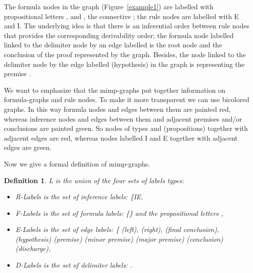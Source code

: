 \documentclass[submission,copyright,creativecommons]{eptcs}
\newtheorem{definition}{Definition}
\begin{document}
The formula nodes in the graph (Figure~\ref{example1}) are labelled with
propositional letters ,  and , the connective ; the
rule nodes are labelled with E and I. The
underlying idea is that there is an inferential order between rule nodes
that provides the corresponding derivability order; the formula node
labelled  linked to the delimiter node  by an edge
labelled  is the root node and the conclusion of the proof represented
by the graph. Besides, the node  linked to the delimiter
node  by the edge labelled  (hypothesis) in the graph is
representing the premise .

We want to emphasize that the mimp-graphs put together information on
formula-graphs and rule nodes. To make it more transparent we can use
bicolored graphs. In this way formula nodes and edges between them are
painted red, whereas inference nodes and edges between them and adjacent
premises and/or conclusions are painted green. So nodes of types  and  (propositions) together with adjacent edges  are red, whereas
nodes labelled I and E together with adjacent edges  are green. 

Now we give a formal definition of mimp-graphs.

\begin{definition}
\label{defLbl} \emph{L} is the union of the four sets of labels types:

\begin{itemize}
\item  \emph{R-Labels} is the set of inference labels: \{IE,

\item  \emph{F-Labels} is the set of formula labels: \{\} and the propositional letters ,

\item  \emph{E-Labels} is the set of edge labels: \{ (left),  (right), 
  (final conclusion),  (hypothesis)   (premise)   (minor premise)   (major premise)   (conclusion)   (discharge),

\item  \emph{D-Labels} is the set of delimiter labels: .
\end{itemize}
\end{definition}
\end{document}
